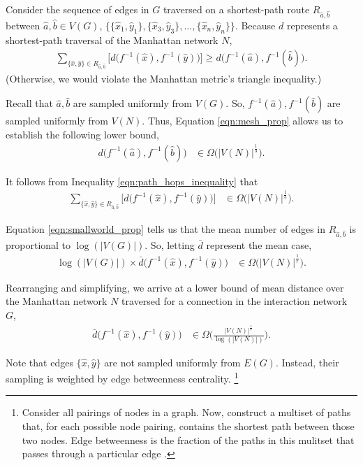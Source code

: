 Consider the sequence of edges in $G$ traversed on a shortest-path route $R_{\hat{a},\hat{b}}$ between $\hat{a}, \hat{b} \in V(G)$, $\{\{\hat{x}_1, \hat{y}_1\}, \{\hat{x}_3, \hat{y}_3\}, \ldots, \{\hat{x}_n, \hat{y}_n\} \}$.
Because $d$ represents a shortest-path traversal of the Manhattan network $N$,
\begin{align} \label{eqn:path_hops_inequality}
\sum_{\{\hat{x}, \hat{y}\} \in  R_{\hat{a},\hat{b}}}
\Big[ d\Big(f^{-1}(\hat{x}), f^{-1}(\hat{y})\Big) \Big]
\geq
d\Big(f^{-1}(\hat{a}), f^{-1}(\hat{b})\Big).
\end{align}
(Otherwise, we would violate the Manhattan metric's triangle inequality.)

Recall that $\hat{a},\hat{b}$ are sampled uniformly from $V(G)$.
So, $f^{-1}(\hat{a}),f^{-1}(\hat{b})$ are sampled uniformly from $V(N)$.
Thus, Equation \ref{eqn:mesh_prop} allows us to establish the following lower bound,
\begin{align} \label{eqn:path_hops_inequality}
d\Big(f^{-1}(\hat{a}), f^{-1}(\hat{b})\Big)
&\in
\Omega \Big(
  |V(N)|^{\frac{1}{3}}
\Big).
\end{align}

It follows from Inequality \ref{eqn:path_hops_inequality} that
\begin{align*}
\sum_{\{\hat{x}, \hat{y}\} \in  R_{\hat{a},\hat{b}}}
\Big[ d\Big(f^{-1}(\hat{x}), f^{-1}(\hat{y})\Big) \Big]
&\in
\Omega \Big(
  |V(N)|^{\frac{1}{3}}
\Big).
\end{align*}

Equation \ref{eqn:smallworld_prop} tells us that the mean number of edges in $R_{\hat{a}, \hat{b}}$ is proportional to $\log(|V(G)|)$.
So, letting $\bar{d}$ represent the mean case,
\begin{align*}
\log(|V(G)|) \times \bar{d}\Big(f^{-1}(\hat{x}), f^{-1}(\hat{y})\Big)
&\in
\Omega \Big(
  |V(N)|^{\frac{1}{r}}
\Big).
\end{align*}

Rearranging and simplifying, we arrive at a lower bound of mean distance over the Manhattan network $N$ traversed for a connection in the interaction network $G$,
\begin{align*}
\bar{d}\Big(f^{-1}(\hat{x}), f^{-1}(\hat{y})\Big)
&\in
\Omega \Big(
  \frac{|V(N)|^{\frac{1}{r}}}{\log(|V(N)|)}
\Big).
\end{align*}

Note that edges $\{\hat{x},\hat{y}\}$ are not sampled uniformly from $E(G)$.
Instead, their sampling is weighted by edge betweenness centrality.
\footnote{
Consider all pairings of nodes in a graph.
Now, construct a multiset of paths that, for each possible node pairing, contains the shortest path between those two nodes.
Edge betweenness is the fraction of the paths in this mulitset that passes through a particular edge \citep{Lu2013}.
}

